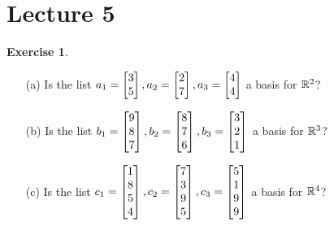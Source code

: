 \documentclass[a4paper]{amsart}
\theoremstyle{definition}
\newtheorem{exercise}{Exercise}
\begin{document}
\section{Lecture 5}

\begin{exercise}\label{ex-basis-i}
 \begin{itemize}
  \item[(a)] Is the list
   $a_1=\left[\begin{matrix} 3\\5\end{matrix}\right], a_2=\left[\begin{matrix} 2\\7\end{matrix}\right], a_3=\left[\begin{matrix} 4\\4\end{matrix}\right]$
   a basis for ${\mathbb{R}}^2$?
   \vspace{0.5pc}
  \item[(b)] Is the list
   $b_1=\left[\begin{matrix} 9\\8\\7\end{matrix}\right], b_2=\left[\begin{matrix} 8\\7\\6\end{matrix}\right], b_3=\left[\begin{matrix} 3\\2\\1\end{matrix}\right]$
   a basis for ${\mathbb{R}}^3$?
   \vspace{0.5pc}
  \item[(c)] Is the list 
   $c_1=\left[\begin{matrix} 1\\8\\5\\4\end{matrix}\right],
    c_2=\left[\begin{matrix} 7\\3\\9\\5\end{matrix}\right],
    c_3=\left[\begin{matrix} 5\\1\\9\\9\end{matrix}\right]$
   a basis for ${\mathbb{R}}^4$?
 \end{itemize}
\end{exercise}
\end{document}

